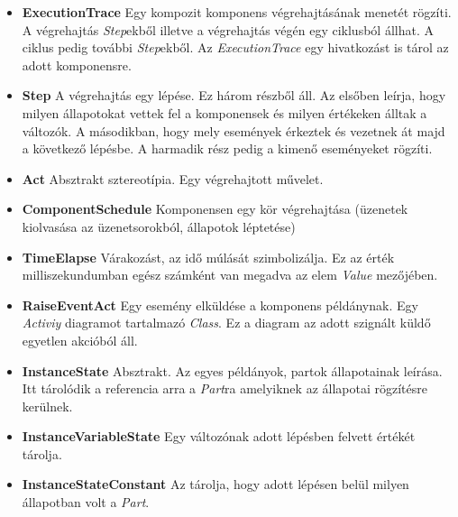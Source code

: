 \begin{itemize}
	\item \textbf{ExecutionTrace} \newline
	Egy kompozit komponens végrehajtásának menetét rögzíti. A végrehajtás \emph{Step}ekből illetve a végrehajtás végén egy ciklusból állhat. A ciklus pedig további \emph{Step}ekből. Az \emph{ExecutionTrace} egy hivatkozást is tárol az adott komponensre.
	
	\item \textbf{Step} \newline
	A végrehajtás egy lépése. Ez három részből áll. Az elsőben leírja, hogy milyen állapotokat vettek fel a komponensek és milyen értékeken álltak a változók. A másodikban, hogy mely események érkeztek és vezetnek át majd a következő lépésbe. A harmadik rész pedig a kimenő eseményeket rögzíti. 
	
	\item \textbf{Act} \newline
	Absztrakt sztereotípia. Egy végrehajtott művelet.
	
	\item \textbf{ComponentSchedule} \newline
	Komponensen egy kör végrehajtása (üzenetek kiolvasása az üzenetsorokból, állapotok léptetése)
	
	\item \textbf{TimeElapse} \newline
	Várakozást, az idő múlását szimbolizálja. Ez az érték milliszekundumban egész számként van megadva az elem \emph{Value} mezőjében.
	
	\item \textbf{RaiseEventAct} \newline
	Egy esemény elküldése a komponens példánynak. Egy \emph{Activiy} diagramot tartalmazó \emph{Class}. Ez a diagram az adott szignált küldő egyetlen akcióból áll.
	
	\item \textbf{InstanceState} \newline
	Absztrakt. Az egyes példányok, partok állapotainak leírása. Itt tárolódik a referencia arra a \emph{Part}ra amelyiknek az állapotai rögzítésre kerülnek.
	
	\item \textbf{InstanceVariableState} \newline
	Egy változónak adott lépésben felvett értékét tárolja.
	
	\item \textbf{InstanceStateConstant} \newline
	Az tárolja, hogy adott lépésen belül milyen állapotban volt a \emph{Part}.
\end{itemize}


